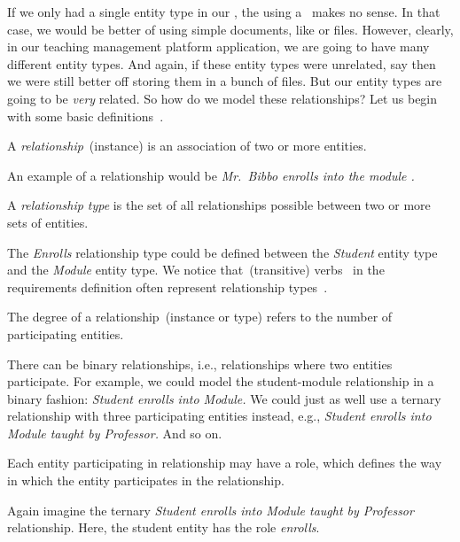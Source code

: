 %
%
\label{sec:conceptual:relationships}%
%
If we only had a single entity type in our \db, the using a \db\ makes no sense.
In that case, we would be better of using simple documents, like  or  files.
However, clearly, in our teaching management platform application, we are going to have many different entity types.
And again, if these entity types were unrelated, say    then we were still better off storing them in a bunch of files.
But our entity types are going to be \emph{very} related.
So how do we model these relationships?
Let us begin with some basic definitions~\cite{G2011EW2ITDS:CMUTERM}.%
%
\begin{definition}[Relationship]%
A \emph{relationship}~(instance) is an association of two or more entities.%
\end{definition}%
%
An example of a relationship would be \emph{Mr.~Bibbo enrolls into the module .}
%
\begin{definition}%
A \emph{relationship type} is the set of all relationships possible between two or more sets of entities.%
\end{definition}%
%
The \emph{Enrolls} relationship type could be defined between the \emph{Student} entity type and the \emph{Module} entity type.
We notice that~(transitive) verbs~\cite{EOWM2025MWAMTD:TA} in the requirements definition often represent relationship types~\cite{C1997ECAED}.%
%
\begin{definition}%
\label{def:degreeOfRelationship}%
The degree of a relationship~(instance or type) refers to the number of participating entities.%
\end{definition}%
%
There can be binary relationships, i.e., relationships where two entities participate.
For example, we could model the student-module relationship in a binary fashion: \emph{Student enrolls into Module.}
We could just as well use a ternary relationship with three participating entities instead, e.g., \emph{Student enrolls into Module taught by Professor.}
And so on.%
%
\begin{definition}%
Each entity participating in relationship may have a role, which defines the way in which the entity participates in the relationship.%
\end{definition}%
%
Again imagine the ternary \emph{Student enrolls into Module taught by Professor} relationship.
Here, the student entity has the role \emph{enrolls}.
